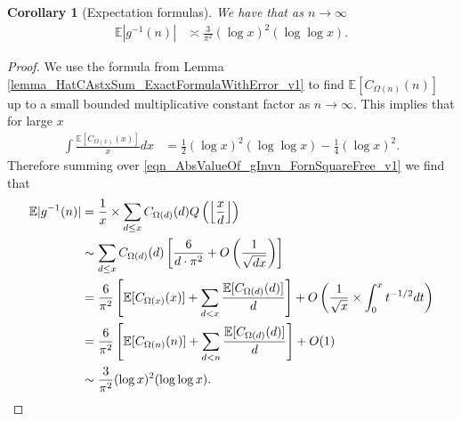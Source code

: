 \documentclass[11pt,reqno,a4letter]{article}
\numberwithin{figure}{section}
\numberwithin{table}{section}
\newcommand{\Floor}[2]{\ensuremath{\left\lfloor \frac{#1}{#2} \right\rfloor}}
\theoremstyle{plain}
\newtheorem{cor}[theorem]{Corollary}
\numberwithin{theorem}{section}
\theoremstyle{definition}
\begin{document}
\begin{cor}[Expectation formulas] 
\label{cor_ExpectationFormulaAbsgInvn_v2} 
We have that as $n \rightarrow \infty$ 
\begin{align*} 
\mathbb{E}|g^{-1}(n)| & \asymp \frac{3}{\pi^2} (\log x)^2 (\log\log x). 
\end{align*} 
\end{cor} 
\begin{proof} 
We use the formula from Lemma \ref{lemma_HatCAstxSum_ExactFormulaWithError_v1} 
to find $\mathbb{E}[C_{\Omega(n)}(n)]$ up to a small bounded multiplicative 
constant factor as $n \rightarrow \infty$.
This implies that for large $x$ 
\begin{align*} 
\int \frac{\mathbb{E}[C_{\Omega(x)}(x)]}{x} dx & = \frac{1}{2} (\log x)^2 (\log\log x) - 
     \frac{1}{4} (\log x)^2. 
\end{align*} 
Therefore summing over \eqref{eqn_AbsValueOf_gInvn_FornSquareFree_v1} 
we find that  
\begin{align} 
\notag 
\mathbb{E}|g^{-1}(n)| & = \frac{1}{x} \times \sum_{d \leq x} 
     C_{\Omega(d)}(d) Q\left(\Floor{x}{d}\right) \\ 
\notag 
     & \sim \sum_{d \leq x} C_{\Omega(d)}(d) \left[\frac{6}{d \cdot \pi^2} + O\left(\frac{1}{\sqrt{dx}}\right) 
     \right] \\ 
\notag 
     & = \frac{6}{\pi^2} \left[\mathbb{E}[C_{\Omega(x)}(x)] + \sum_{d<x} 
     \frac{\mathbb{E}[C_{\Omega(d)}(d)]}{d}\right] + 
     O\left(\frac{1}{\sqrt{x}} \times \int_0^{x} t^{-1/2} dt\right) \\ 
\label{eqn_proof_tag_ExpAbsgInvn_ExpandedByExpsOfCkn_v1} 
     & = \frac{6}{\pi^2}\left[\mathbb{E}[C_{\Omega(n)}(n)] + 
     \sum_{d<n} \frac{\mathbb{E}[C_{\Omega(d)}(d)]}{d}\right] + O(1) \\ 
\notag 
     & \sim \frac{3}{\pi^2} (\log x)^2 (\log\log x). 
     \qedhere 
\end{align} 
\end{proof} 
\end{document}
